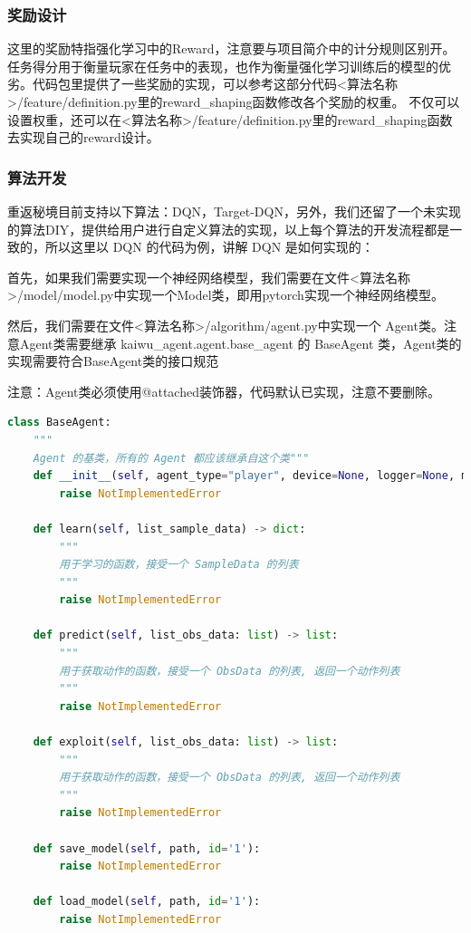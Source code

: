 \subsubsection{奖励设计}

这里的奖励特指强化学习中的Reward，注意要与项目简介中的计分规则区别开。任务得分用于衡量玩家在任务中的表现，也作为衡量强化学习训练后的模型的优劣。代码包里提供了一些奖励的实现，可以参考这部分代码<算法名称>/feature/definition.py里的reward\_shaping函数修改各个奖励的权重。
不仅可以设置权重，还可以在<算法名称>/feature/definition.py里的reward\_shaping函数去实现自己的reward设计。

\subsubsection{算法开发}

重返秘境目前支持以下算法：DQN，Target-DQN，另外，我们还留了一个未实现的算法DIY，提供给用户进行自定义算法的实现，以上每个算法的开发流程都是一致的，所以这里以 DQN 的代码为例，讲解 DQN 是如何实现的：

首先，如果我们需要实现一个神经网络模型，我们需要在文件<算法名称>/model/model.py中实现一个Model类，即用pytorch实现一个神经网络模型。

然后，我们需要在文件<算法名称>/algorithm/agent.py中实现一个 Agent类。注意Agent类需要继承 kaiwu\_agent.agent.base\_agent 的 BaseAgent 类，Agent类的实现需要符合BaseAgent类的接口规范

注意：Agent类必须使用@attached装饰器，代码默认已实现，注意不要删除。


\begin{lstlisting}[language=Python]
    class BaseAgent:
    """
    Agent 的基类，所有的 Agent 都应该继承自这个类"""
    def __init__(self, agent_type="player", device=None, logger=None, monitor=None) -> None:
        raise NotImplementedError

    def learn(self, list_sample_data) -> dict:
        """
        用于学习的函数，接受一个 SampleData 的列表
        """
        raise NotImplementedError

    def predict(self, list_obs_data: list) -> list:
        """
        用于获取动作的函数，接受一个 ObsData 的列表, 返回一个动作列表
        """
        raise NotImplementedError

    def exploit(self, list_obs_data: list) -> list:
        """
        用于获取动作的函数，接受一个 ObsData 的列表, 返回一个动作列表
        """
        raise NotImplementedError

    def save_model(self, path, id='1'):
        raise NotImplementedError

    def load_model(self, path, id='1'):
        raise NotImplementedError
\end{lstlisting}

